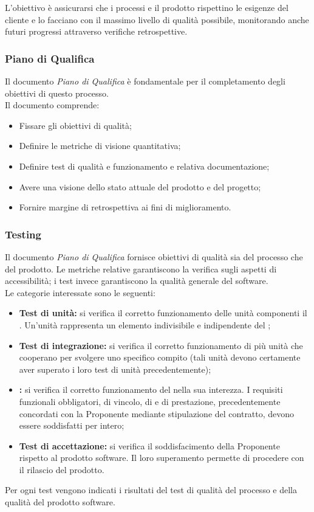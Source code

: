 L'obiettivo è assicurarsi che i processi e il prodotto rispettino le esigenze del cliente e lo facciano con il massimo livello di qualità possibile, monitorando anche futuri progressi attraverso verifiche retrospettive.
\subsubsection{Piano di Qualifica}
Il documento \textit{Piano di Qualifica} è fondamentale per il completamento degli obiettivi di questo processo. 
\\Il documento comprende:
\begin{itemize}
    \item Fissare gli obiettivi di qualità;
    \item Definire le metriche di visione quantitativa;
    \item Definire test di qualità e funzionamento e relativa documentazione;
    \item Avere una visione dello stato attuale del prodotto e del progetto;
    \item Fornire margine di retrospettiva ai fini di miglioramento.
\end{itemize}
\subsubsection{Testing}
Il documento \textit{Piano di Qualifica} fornisce obiettivi di qualità sia del processo che del prodotto. Le metriche relative garantiscono la verifica sugli aspetti di accessibilità; i test invece garantiscono la qualità generale del software. 
\\Le categorie interessate sono le seguenti:
\begin{itemize}
	\item \textbf{Test di unità:} si verifica il corretto funzionamento delle unità componenti il . Un’unità rappresenta un elemento indivisibile e indipendente del ; 
	\item \textbf{Test di integrazione:} si verifica il corretto funzionamento di più unità che cooperano per svolgere uno specifico compito (tali unità devono certamente aver superato i loro test di unità precedentemente);
	\item \textbf{:} si verifica il corretto funzionamento del  nella sua interezza. I requisiti funzionali obbligatori, di vincolo, di  e di prestazione, precedentemente concordati con la Proponente mediante stipulazione del contratto, devono essere soddisfatti per intero;
	\item \textbf{Test di accettazione:} si verifica il soddisfacimento della Proponente rispetto al prodotto software. Il loro superamento permette di procedere con il rilascio del prodotto.
\end{itemize}
Per ogni test vengono indicati i risultati del test di qualità del processo e della qualità del prodotto software.
